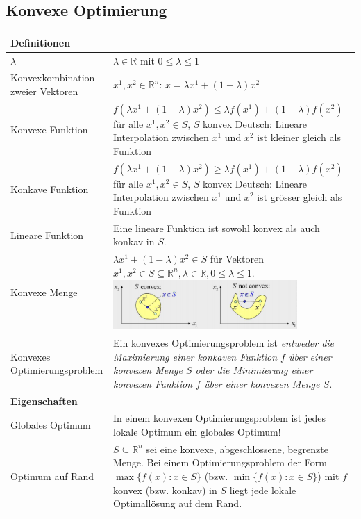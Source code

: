 \subsection{Konvexe Optimierung }
  \begin{tabularx}{\textwidth}{p{6cm} X}
  \hline
    \textbf{Definitionen} & \\
  \hline
    $\lambda$
      & $\lambda \in \mathbb{R}$ mit $0 \leq \lambda \leq 1$\\
    Konvexkombination zweier Vektoren
      & $x^1, x^2 \in \mathbb{R}^n$:  $x = \lambda x^1 + (1-\lambda) x^2$ \\
    Konvexe Funktion
      & $f(\lambda x^1 + (1-\lambda)x^2) \leq \lambda f(x^1) + (1-\lambda)f(x^2)$ für alle $x^1, x^2 \in S$, $S$ konvex \newline
      Deutsch: Lineare Interpolation zwischen $x^1$ und $x^2$ ist kleiner gleich als Funktion\\
    Konkave Funktion
      & $f(\lambda x^1 + (1-\lambda)x^2) \geq \lambda f(x^1) + (1-\lambda)f(x^2)$ für alle $x^1, x^2 \in S$, $S$ konvex \newline
      Deutsch: Lineare Interpolation zwischen $x^1$ und $x^2$ ist grösser gleich als Funktion\\
    Lineare Funktion
      & Eine lineare Funktion ist sowohl konvex als auch konkav in $S$.\\
    Konvexe Menge
      & $\lambda x^1 + (1-\lambda)x^2 \in S$ für Vektoren $x^1,x^2 \in S \subseteq \mathbb{R}^n, \lambda \in \mathbb{R}, 0 \leq \lambda \leq 1$.\newline
      \includegraphics[width=7cm]{./Content/OptMathModels/ConvexSet} \\
    Konvexes Optimierungsproblem
      & Ein konvexes Optimierungsproblem ist \em entweder \em die Maximierung einer konkaven Funktion $f$ über einer konvexen Menge $S$ \em oder \em die Minimierung einer konvexen Funktion $f$ über einer konvexen Menge $S$.\\
  \hline  
    \textbf{Eigenschaften} & \\
  \hline
    Globales Optimum
      & In einem konvexen Optimierungsproblem ist jedes lokale Optimum ein globales Optimum! \\
    Optimum auf Rand
      & $S \subseteq \mathbb{R}^n$ sei eine konvexe, abgeschlossene, begrenzte Menge. Bei einem Optimierungsproblem der Form $\max\{ f(x) : x \in S \}$ (bzw. $\min\{ f(x) : x \in S \}$) mit $f$ konvex (bzw. konkav) in $S$ liegt jede lokale Optimallösung auf dem Rand. \newline 

\end{tabularx}
